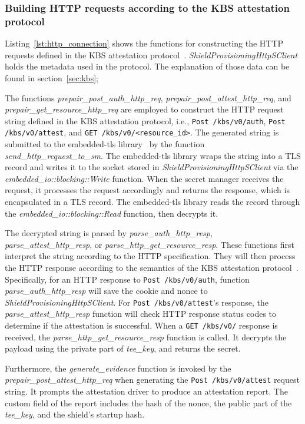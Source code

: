 \subsubsection{Building HTTP requests according to the KBS attestation protocol}
Listing~\ref{lst:http_connection} shows the functions for constructing the HTTP requests defined in the KBS attestation protocol~\cite*{kbs_Attestation_protocol}. \emph{ShieldProvisioningHttpSClient} holds the metadata used in the protocol. The explanation of those data can be found in 
section~\ref{sec:kbs};


The functions \emph{prepair\_post\_auth\_http\_req}, \emph{prepair\_post\_attest\_http\_req}, and \emph{prepair\_get\_resource\_http\_req} are employed to construct the HTTP request string defined in the KBS attestation protocol, i.e., \texttt{Post /kbs/v0/auth}, \texttt{Post /kbs/v0/attest}, and
\texttt{GET /kbs/v0/<resource\_id>}. 
The generated string is submitted to the embedded-tls library~\cite*{embede_tls} by the function \emph{send\_http\_request\_to\_sm}. The embedded-tls library wraps the string into a TLS record and writes it to the socket stored in \emph{ShieldProvisioningHttpSClient} via the 
\emph{embedded\_io::blocking::Write} function. When the secret manager receives the request, it processes the request accordingly and returns the response, which is encapsulated in a TLS record. The embedded-tls library reads the record through the 
\emph{embedded\_io::blocking::Read} function, then decrypts it.

The decrypted string is parsed by \emph{parse\_auth\_http\_resp}, \emph{parse\_attest\_http\_resp}, or \emph{parse\_http\_get\_resource\_resp}. These functions first interpret the string according to the HTTP specification. They will then process the HTTP 
response according to the semantics of the KBS attestation protocol~\cite*{kbs_Attestation_protocol}. Specifically, for an HTTP response to \texttt{Post /kbs/v0/auth}, function \emph{parse\_auth\_http\_resp} will save the cookie and nonce to \emph{ShieldProvisioningHttpSClient}. 
For \texttt{Post /kbs/v0/attest}'s response, the \emph{parse\_attest\_http\_resp} function will check HTTP response status codes to determine if the attestation is successful. When a \texttt{GET /kbs/v0/} response is received, the \emph{parse\_http\_get\_resource\_resp} function is called. 
It decrypts the payload using the private part of \emph{tee\_key}, and returns the secret.

Furthermore, the \emph{generate\_evidence} function is invoked by the \emph{prepair\_post\_attest\_http\_req} when generating the \texttt{Post /kbs/v0/attest} request string. It prompts the attestation driver to produce an attestation report. The custom field of the report includes the 
hash of the nonce, the public part of the \emph{tee\_key}, and the shield's startup hash.                                                                                                                                                                                                                                                                                                


